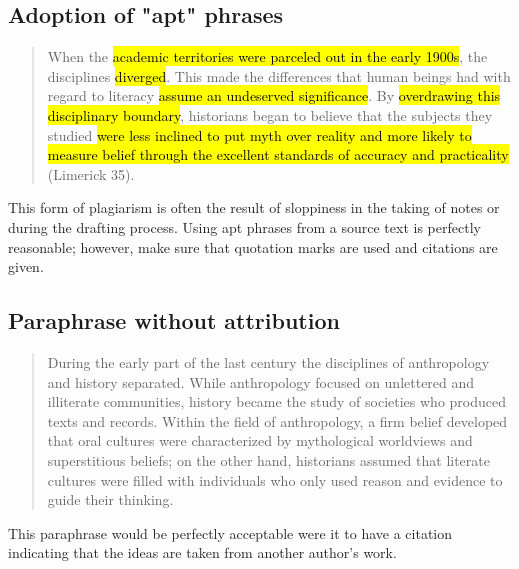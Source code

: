 \subsection{Adoption of "apt" phrases}

\begin{Spacing}{1.5}
\begin{quote}
When the \hl{academic territories were parceled out in the early 1900s}, the disciplines \hl{diverged}. This made the differences that human beings had with regard to literacy \hl{assume an undeserved significance}. By \hl{overdrawing this disciplinary boundary}, historians began to believe that the subjects they studied \hl{were less inclined to put myth over reality and more likely to measure belief through the excellent standards of accuracy and practicality} (Limerick 35). 
\end{quote}
\end{Spacing}

 This form of plagiarism is often the result of sloppiness in the taking of notes or during the drafting process. Using apt phrases from a source text is perfectly reasonable; however, make sure that quotation marks are used and citations are given.

\subsection{Paraphrase without attribution}
\begin{Spacing}{1.5}
\begin{quote}
During the early part of the last century the disciplines of anthropology and history separated. While anthropology focused on unlettered and illiterate communities, history became the study of societies who produced texts and records. Within the field of anthropology, a firm belief developed that oral cultures were characterized by mythological worldviews and superstitious beliefs; on the other hand, historians assumed that literate cultures were filled with individuals who only used reason and evidence to guide their thinking.
\end{quote}
\end{Spacing}

 This paraphrase would be perfectly acceptable were it to have a citation indicating that the ideas are taken from another author's work.




